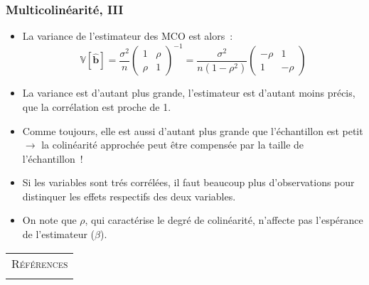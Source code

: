 \documentclass[10pt]{beamer}
\theoremstyle{plain}
\begin{document}
\begin{frame}
  \frametitle{Multicolinéarité, III}

  \begin{itemize}


  \item La variance de l'estimateur des MCO est alors~:
    \[
      \mathbb V[\hat{\mathbf{b}}] = \frac{\sigma^2}{n}
      \begin{pmatrix}
        1 & \rho\\
        \rho & 1
      \end{pmatrix}^{-1}
      = \frac{\sigma^2}{n(1-\rho^2)}
      \begin{pmatrix}
        -\rho & 1\\
        1 & -\rho
      \end{pmatrix}
    \]

    \medskip

  \item La variance est d'autant plus grande, l'estimateur est d'autant moins précis, que la corrélation est proche de 1.\newline

  \item Comme toujours, elle est aussi d'autant plus grande que l'échantillon est petit $\rightarrow$ la colinéarité approchée peut être compensée par la taille de l'échantillon~!\newline

  \item Si les variables sont trés corrélées, il faut beaucoup plus d'observations pour distinquer les effets respectifs des deux variables.\newline

  \item On note que $\rho$, qui caractérise le degré de colinéarité, n'affecte pas l'espérance de l'estimateur ($\beta$).

  \end{itemize}

\end{frame}



\begin{notes}

  \begin{center}
    \begin{tabular}{c}
      \\
      \Huge{\textsc{Références}}\\
      \\
    \end{tabular}
  \end{center}

  \bigskip

  \nocite{Green2017}

  \nocite{Schmidt1976}

  \printbibliography

\end{notes}
\end{document}

